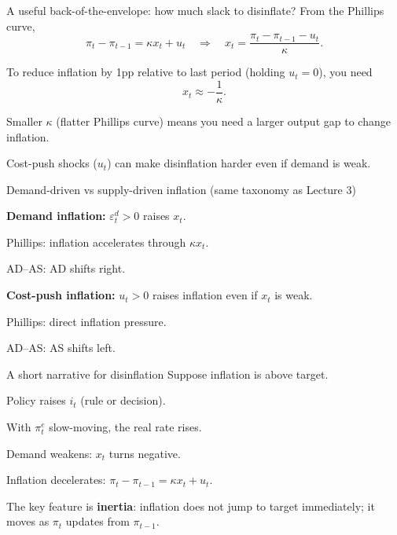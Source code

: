 \documentclass[aspectratio=169,xcolor=dvipsnames]{beamer}
\let\tempone\itemize
\let\temptwo\enditemize
\renewenvironment{itemize}{\tempone\addtolength{\itemsep}{\fill}}{\temptwo}
\let\tempa\enumerate
\let\tempb\endenumerate
\renewenvironment{enumerate}{\tempa\addtolength{\itemsep}{\fill}}{\tempb}
\begin{document}
\begin{frame}{A useful back-of-the-envelope: how much slack to disinflate?}
\small
From the Phillips curve,
\[
\pi_t-\pi_{t-1}=\kappa x_t+u_t
\quad\Rightarrow\quad
x_t=\frac{\pi_t-\pi_{t-1}-u_t}{\kappa}.
\]

\begin{itemize}
\item To reduce inflation by 1pp relative to last period (holding $u_t=0$), you need
\[
x_t\approx -\frac{1}{\kappa}.
\]
\item Smaller $\kappa$ (flatter Phillips curve) means you need a larger output gap to change inflation.
\item Cost-push shocks ($u_t$) can make disinflation harder even if demand is weak.
\end{itemize}
\end{frame}

\begin{frame}{Demand-driven vs supply-driven inflation (same taxonomy as Lecture 3)}
\small
\begin{itemize}
\item \textbf{Demand inflation:} $\varepsilon_t^{d}>0$ raises $x_t$.
\begin{itemize}
\item Phillips: inflation accelerates through $\kappa x_t$.
\item AD--AS: AD shifts right.
\end{itemize}
\item \textbf{Cost-push inflation:} $u_t>0$ raises inflation even if $x_t$ is weak.
\begin{itemize}
\item Phillips: direct inflation pressure.
\item AD--AS: AS shifts left.
\end{itemize}
\end{itemize}
\end{frame}

\begin{frame}{A short narrative for disinflation}
\small
Suppose inflation is above target.

\begin{enumerate}
\item Policy raises $i_t$ (rule or decision).
\item With $\pi_t^{e}$ slow-moving, the real rate rises.
\item Demand weakens: $x_t$ turns negative.
\item Inflation decelerates: $\pi_t-\pi_{t-1}=\kappa x_t + u_t$.
\end{enumerate}

\vspace{0.3em}
\small
The key feature is \textbf{inertia}: inflation does not jump to target immediately; it moves as $\pi_t$ updates from $\pi_{t-1}$.
\end{frame}
\end{document}
